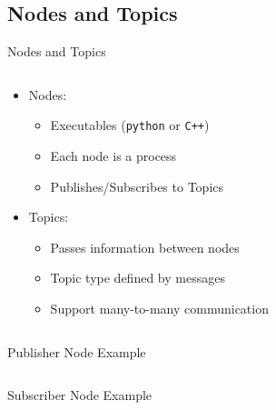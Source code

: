 \documentclass{beamer}
\begin{document}
\subsection{Nodes and Topics}
\begin{frame}{Nodes and Topics}
	\begin{columns}[c]
		\begin{column}{0.6\textwidth}
			\begin{itemize}
				\item Nodes:
					\begin{itemize}
					\item Executables (\texttt{python} or \texttt{C++})
					\item Each node is a process
					\item Publishes/Subscribes to Topics
					\end{itemize}
				\item Topics:
					\begin{itemize}
					\item Passes information between nodes
					\item Topic type defined by messages
					\item Support many-to-many communication
					\end{itemize}
			\end{itemize}
		\end{column}
		\begin{column}{0.4\textwidth}
		\end{column}
	\end{columns}
\end{frame}

\begin{frame}{Publisher Node Example}
	\inputminted{python}{snippet/publisher_node.py}
\end{frame}

\begin{frame}{Subscriber Node Example}
	\inputminted{python}{snippet/subscriber_node.py}
\end{frame}
\end{document}
